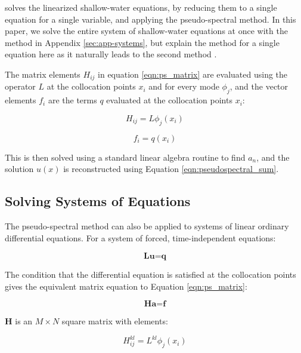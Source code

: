  \citet{boyd1978shearI} solves the linearized shallow-water equations, by reducing them to a single equation for a single variable, and applying the pseudo-spectral method. In this paper, we solve the entire system of shallow-water equations at once with the method in Appendix \ref{sec:app-systems}, but explain the method for a single equation here as it naturally leads to the second method \citep{boyd2000spectral}.

The matrix elements $H_{ij}$ in equation \ref{eqn:ps_matrix} are evaluated using the operator $L$ at the collocation points $x_{i}$ and for every mode $\phi_{j}$, and the vector elements $f_{i}$ are the terms $q$ evaluated at the collocation points $x_{i}$:

\begin{equation}\label{eqn:ps_H}
  H_{ij} = L \phi_{j}(x_{i})
\end{equation}

\begin{equation}
  f_{i} = q(x_{i})
\end{equation}


This is then solved using a standard linear algebra routine to find $a_{n}$, and the solution $u(x)$ is reconstructed using Equation \ref{eqn:pseudospectral_sum}.


\subsection*{Solving Systems of Equations}\label{sec:app-systems}

The pseudo-spectral method can also be applied to systems of linear ordinary differential equations. For a system of forced, time-independent equations:

\begin{equation}
  \textbf{L} \textbf{u} = \textbf{q}
\end{equation}


The condition that the differential equation is satisfied at the collocation points gives the equivalent matrix equation to Equation \ref{eqn:ps_matrix}:

\begin{equation}
  \textbf{H} \textbf{a} = \textbf{f}
\end{equation}

$\textbf{H}$ is an $M \times N$ square matrix with elements:

\begin{equation}
  H^{kl}_{ij} = L^{kl}\phi_{j}(x_{i})
\end{equation}

